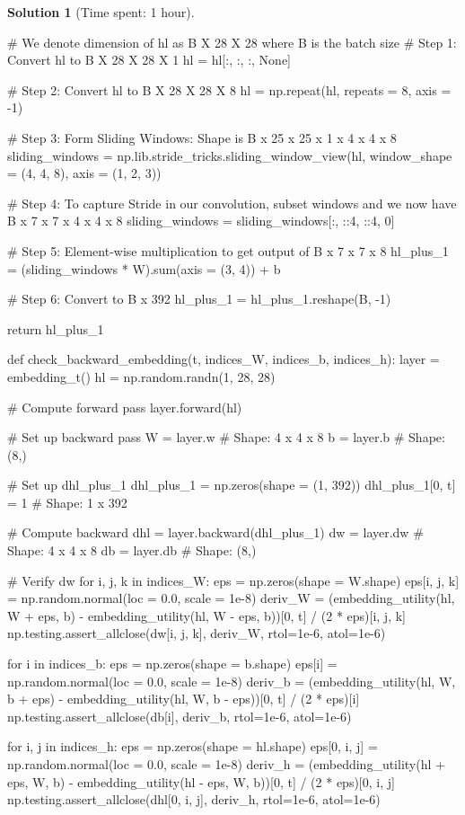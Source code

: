 \documentclass[11pt, reqno, letterpaper, twoside]{amsart}
\theoremstyle{plain}
\theoremstyle{definition}
\newtheorem{solution}[theorem]{Solution}
\begin{document}
\begin{solution}[Time spent: 1 hour]
\begin{enumerate}
\begin{python}
    # We denote dimension of hl as B X 28 X 28 where B is the batch size
    # Step 1: Convert hl to B X 28 X 28 X 1
    hl = hl[:, :, :, None]

    # Step 2: Convert hl to B X 28 X 28 X 8
    hl = np.repeat(hl, repeats = 8, axis = -1)

    # Step 3: Form Sliding Windows: Shape is B x 25 x 25 x 1 x 4 x 4 x 8
    sliding_windows = np.lib.stride_tricks.sliding_window_view(hl, window_shape = (4, 4, 8), axis = (1, 2, 3))
    
    # Step 4: To capture Stride in our convolution, subset windows and we now have B x 7 x 7 x 4 x 4 x 8
    sliding_windows = sliding_windows[:, ::4, ::4, 0]

    # Step 5: Element-wise multiplication to get output of B x 7 x 7 x 8
    hl_plus_1 = (sliding_windows * W).sum(axis = (3, 4)) + b

    # Step 6: Convert to B x 392
    hl_plus_1 = hl_plus_1.reshape(B, -1)

    return hl_plus_1

def check_backward_embedding(t, indices_W, indices_b, indices_h):
    layer = embedding_t()
    hl = np.random.randn(1, 28, 28)

    # Compute forward pass
    layer.forward(hl)

    # Set up backward pass
    W = layer.w # Shape: 4 x 4 x 8
    b = layer.b # Shape: (8,)

    # Set up dhl_plus_1
    dhl_plus_1 = np.zeros(shape = (1, 392))
    dhl_plus_1[0, t] = 1 # Shape: 1 x 392

    # Compute backward
    dhl = layer.backward(dhl_plus_1)
    dw = layer.dw # Shape: 4 x 4 x 8
    db = layer.db # Shape: (8,)

    # Verify dw
    for i, j, k in indices_W:
        eps = np.zeros(shape = W.shape)
        eps[i, j, k] = np.random.normal(loc = 0.0, scale = 1e-8)
        deriv_W = (embedding_utility(hl, W + eps, b) - embedding_utility(hl, W - eps, b))[0, t] / (2 * eps)[i, j, k]
        np.testing.assert_allclose(dw[i, j, k], deriv_W, rtol=1e-6, atol=1e-6)
    
    for i in indices_b:
        eps = np.zeros(shape = b.shape)
        eps[i] = np.random.normal(loc = 0.0, scale = 1e-8)
        deriv_b = (embedding_utility(hl, W, b + eps) - embedding_utility(hl, W, b - eps))[0, t] / (2 * eps)[i]
        np.testing.assert_allclose(db[i], deriv_b, rtol=1e-6, atol=1e-6)
    
    for i, j in indices_h:
        eps = np.zeros(shape = hl.shape)
        eps[0, i, j] = np.random.normal(loc = 0.0, scale = 1e-8)
        deriv_h = (embedding_utility(hl + eps, W, b) - embedding_utility(hl - eps, W, b))[0, t] / (2 * eps)[0, i, j]
        np.testing.assert_allclose(dhl[0, i, j], deriv_h, rtol=1e-6, atol=1e-6)


\end{python}
\end{enumerate}
\end{solution}
\end{document}
